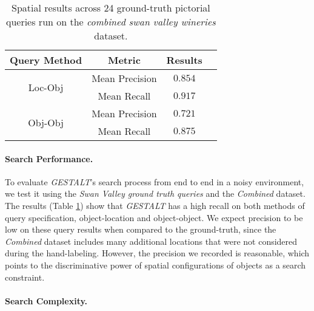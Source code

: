 \small{
\begin{table}[h!]
    \begin{center}
        \begin{tabular}{ |c|c|c|c| } 
            \hline
            Query Method & Metric & Results \\
            \hline
            \multirow{2}{7em}{Loc-Obj} & Mean Precision & $0.854$ \\
            & Mean Recall & $0.917$\\%
            \hline     
            \multirow{2}{7em}{Obj-Obj} & Mean Precision & $0.721$ \\ 
            &Mean Recall & $0.875$ \\
            \hline
        \end{tabular}
        \caption{Spatial results across 24 ground-truth pictorial queries run on the \textit{combined swan valley wineries} dataset.} %
        \label{Table:GroundTruth}
    \end{center}
\end{table}
}

\paragraph{Search Performance.}

To evaluate \emph{GESTALT}'s search process from end to end in a noisy environment, we test it using the \textit{Swan Valley ground truth queries} and the \textit{Combined} dataset.
The results (Table \ref{Table:GroundTruth}) show that \emph{GESTALT} has a high recall on both methods of query specification, object-location and object-object.
We expect precision to be low on these query results when compared to the ground-truth, since the \textit{Combined} dataset includes many additional locations that were not considered during the hand-labeling.
However, the precision we recorded is reasonable, which points to the discriminative power of spatial configurations of objects as a search constraint.


\paragraph{Search Complexity.}

